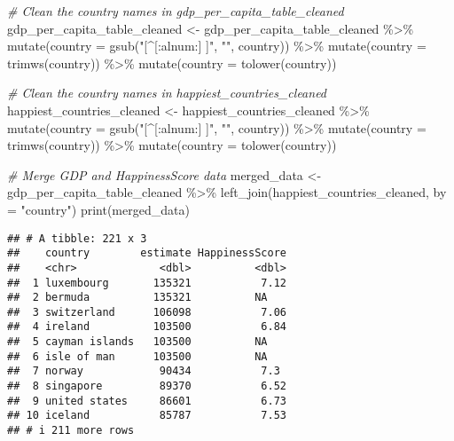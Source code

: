 \documentclass[
]{article}
\newenvironment{Shaded}{\begin{snugshade}}{\end{snugshade}}
\newcommand{\AttributeTok}[1]{\textcolor[rgb]{0.77,0.63,0.00}{#1}}
\newcommand{\CommentTok}[1]{\textcolor[rgb]{0.56,0.35,0.01}{\textit{#1}}}
\newcommand{\FunctionTok}[1]{\textcolor[rgb]{0.00,0.00,0.00}{#1}}
\newcommand{\NormalTok}[1]{#1}
\newcommand{\OtherTok}[1]{\textcolor[rgb]{0.56,0.35,0.01}{#1}}
\newcommand{\SpecialCharTok}[1]{\textcolor[rgb]{0.00,0.00,0.00}{#1}}
\newcommand{\StringTok}[1]{\textcolor[rgb]{0.31,0.60,0.02}{#1}}
\begin{document}
\begin{Shaded}
\begin{Highlighting}[]
\CommentTok{\# Clean the country names in gdp\_per\_capita\_table\_cleaned}
\NormalTok{gdp\_per\_capita\_table\_cleaned }\OtherTok{\textless{}{-}}\NormalTok{ gdp\_per\_capita\_table\_cleaned }\SpecialCharTok{\%\textgreater{}\%}
  \FunctionTok{mutate}\NormalTok{(}\AttributeTok{country =} \FunctionTok{gsub}\NormalTok{(}\StringTok{"[\^{}[:alnum:] ]"}\NormalTok{, }\StringTok{""}\NormalTok{, country)) }\SpecialCharTok{\%\textgreater{}\%}  
  \FunctionTok{mutate}\NormalTok{(}\AttributeTok{country =} \FunctionTok{trimws}\NormalTok{(country)) }\SpecialCharTok{\%\textgreater{}\%}                   
  \FunctionTok{mutate}\NormalTok{(}\AttributeTok{country =} \FunctionTok{tolower}\NormalTok{(country))                      }

\CommentTok{\# Clean the country names in happiest\_countries\_cleaned}
\NormalTok{happiest\_countries\_cleaned }\OtherTok{\textless{}{-}}\NormalTok{ happiest\_countries\_cleaned }\SpecialCharTok{\%\textgreater{}\%}
  \FunctionTok{mutate}\NormalTok{(}\AttributeTok{country =} \FunctionTok{gsub}\NormalTok{(}\StringTok{"[\^{}[:alnum:] ]"}\NormalTok{, }\StringTok{""}\NormalTok{, country)) }\SpecialCharTok{\%\textgreater{}\%}  
  \FunctionTok{mutate}\NormalTok{(}\AttributeTok{country =} \FunctionTok{trimws}\NormalTok{(country)) }\SpecialCharTok{\%\textgreater{}\%}                    
  \FunctionTok{mutate}\NormalTok{(}\AttributeTok{country =} \FunctionTok{tolower}\NormalTok{(country))                     }

\CommentTok{\# Merge GDP and HappinessScore data}
\NormalTok{merged\_data }\OtherTok{\textless{}{-}}\NormalTok{ gdp\_per\_capita\_table\_cleaned }\SpecialCharTok{\%\textgreater{}\%}
  \FunctionTok{left\_join}\NormalTok{(happiest\_countries\_cleaned, }\AttributeTok{by =} \StringTok{"country"}\NormalTok{)}
\FunctionTok{print}\NormalTok{(merged\_data)}
\end{Highlighting}
\end{Shaded}

\begin{verbatim}
## # A tibble: 221 x 3
##    country        estimate HappinessScore
##    <chr>             <dbl>          <dbl>
##  1 luxembourg       135321           7.12
##  2 bermuda          135321          NA   
##  3 switzerland      106098           7.06
##  4 ireland          103500           6.84
##  5 cayman islands   103500          NA   
##  6 isle of man      103500          NA   
##  7 norway            90434           7.3 
##  8 singapore         89370           6.52
##  9 united states     86601           6.73
## 10 iceland           85787           7.53
## # i 211 more rows
\end{verbatim}
\end{document}
